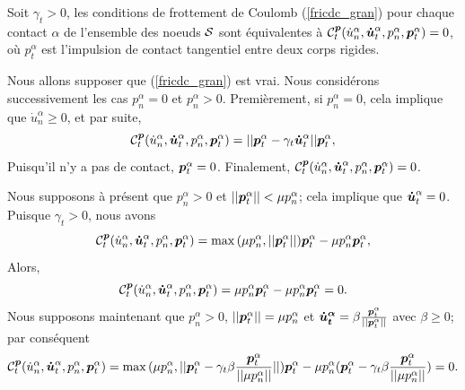 \begin{proposition}\label{prop2}
Soit $\gamma_t>0$, les conditions de frottement de Coulomb (\ref{fricdc_gran}) pour chaque contact $\alpha $ de l'ensemble des noeuds $ {\cal S} $ sont équivalentes à ${\cal C}_{t}^{\boldsymbol{p}}(\dot{u}^{\alpha}_n,\boldsymbol{\dot{u}}^{\alpha}_t,p^{\alpha}_n,\boldsymbol{p}^{\alpha}_t)=0$,
où $p^{\alpha}_t$ est l'impulsion de contact tangentiel entre deux corps rigides.
\end{proposition}

\begin{pruf}
Nous allons supposer que (\ref{fricdc_gran}) est vrai. Nous considérons successivement les cas $p^{\alpha}_n = 0$ et $p^{\alpha}_n > 0$. Premièrement, si $p^{\alpha}_n = 0$, cela implique que $\dot{u}^{\alpha}_n \geq 0$, et par suite,
\begin{equation*}
{\cal C}_{t}^{\boldsymbol{p}}(\dot{u}^{\alpha}_n,\boldsymbol{\dot{u}}^{\alpha}_t,p^{\alpha}_n,\boldsymbol{p}^{\alpha}_t)=||\boldsymbol{p}^{\alpha}_t - \gamma_t \boldsymbol{\dot{u}}^{\alpha}_t|| \boldsymbol{p}^{\alpha}_t,
\end{equation*}
\noindent Puisqu'il n'y a pas de contact, $\boldsymbol{p}^{\alpha}_t=0$. Finalement, ${\cal C}_{t}^{\boldsymbol{p}}(\dot{u}^{\alpha}_n,\boldsymbol{\dot{u}}^{\alpha}_t,p^{\alpha}_n,\boldsymbol{p}^{\alpha}_t)=0$.

\noindent Nous supposons à présent que $p^{\alpha}_n > 0$ et $||\boldsymbol{p}^{\alpha}_t|| < \mu p^{\alpha}_n$; cela implique que $\boldsymbol{\dot{u}}^{\alpha}_t=0$. Puisque $\gamma_t>0$, nous avons
\begin{equation*}
{\cal C}_{t}^{\boldsymbol{p}}(\dot{u}^{\alpha}_n,\boldsymbol{\dot{u}}^{\alpha}_t,p^{\alpha}_n,\boldsymbol{p}^{\alpha}_t)=\max{(\mu p^{\alpha}_n, ||\boldsymbol{p}^{\alpha}_t||)}\boldsymbol{p}^{\alpha}_t - \mu p^{\alpha}_n\boldsymbol{p}^{\alpha}_t,
\end{equation*}
\noindent Alors,
\begin{equation*}
{\cal C}_{t}^{\boldsymbol{p}}(\dot{u}^{\alpha}_n,\boldsymbol{\dot{u}}^{\alpha}_t,p^{\alpha}_n,\boldsymbol{p}^{\alpha}_t)=\mu p^{\alpha}_n\boldsymbol{p}^{\alpha}_t - \mu p^{\alpha}_n\boldsymbol{p}^{\alpha}_t = 0.
\end{equation*}
\noindent Nous supposons maintenant que $p^{\alpha}_n > 0$, $||\boldsymbol{p}^{\alpha}_t|| = \mu p^{\alpha}_n$ et $\boldsymbol{\dot{u}^{\alpha}_t} = \beta \frac{\boldsymbol{p}^{\alpha}_t}{||\boldsymbol{p}^{\alpha}_t||}$ avec $\beta\geq0$; par conséquent
\begin{equation*}
{\cal C}_{t}^{\boldsymbol{p}}(\dot{u}^{\alpha}_n,\boldsymbol{\dot{u}}^{\alpha}_t,p^{\alpha}_n,\boldsymbol{p}^{\alpha}_t)= \max{(\mu p^{\alpha}_n, ||\boldsymbol{p}^{\alpha}_t - \gamma_t \beta \frac{\boldsymbol{p}^{\alpha}_t}{||\mu p^{\alpha}_n||}||)}\boldsymbol{p}^{\alpha}_t - \mu p^{\alpha}_n(\boldsymbol{p}^{\alpha}_t - \gamma_t \beta \frac{\boldsymbol{p}^{\alpha}_t}{||\mu p^{\alpha}_n||}) = 0.
\end{equation*}


\end{pruf}
